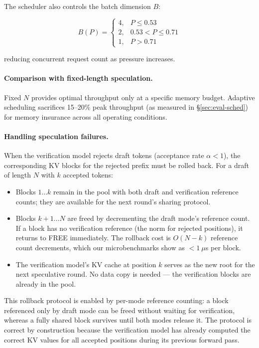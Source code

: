 \documentclass[review]{elsarticle}
\theoremstyle{definition}
\theoremstyle{remark}
\begin{document}
The scheduler also controls the batch dimension $B$:

\[
B(P) = \begin{cases}
4, & P \leq 0.53 \\
2, & 0.53 < P \leq 0.71 \\
1, & P > 0.71
\end{cases}
\]

reducing concurrent request count as pressure increases.

\paragraph{Comparison with fixed-length speculation.}
Fixed $N$ provides optimal throughput only at a specific memory budget.
Adaptive scheduling sacrifices 15--20\% peak throughput (as measured in
\S\ref{sec:eval-sched}) for memory insurance across all operating
conditions.

\paragraph{Handling speculation failures.}
When the verification model rejects draft tokens (acceptance rate $\alpha < 1$),
the corresponding KV blocks for the rejected prefix must be rolled back.
For a draft of length $N$ with $k$ accepted tokens:
\begin{itemize}
    \item Blocks $1 \ldots k$ remain in the pool with both draft and
    verification reference counts; they are available for the next round's
    sharing protocol.
    \item Blocks $k+1 \ldots N$ are freed by decrementing the draft mode's
    reference count. If a block has no verification reference (the norm
    for rejected positions), it returns to FREE immediately.
    The rollback cost is $O(N-k)$ reference count decrements, which our
    microbenchmarks show as $<1~\mu$s per block.
    \item The verification model's KV cache at position $k$ serves as the
    new root for the next speculative round. No data copy is needed ---
    the verification blocks are already in the pool.
\end{itemize}
This rollback protocol is enabled by per-mode reference counting: a
block referenced only by draft mode can be freed without waiting for
verification, whereas a fully shared block survives until both modes
release it. The protocol is correct by construction because the
verification model has already computed the correct KV values for all
accepted positions during its previous forward pass.
\end{document}
